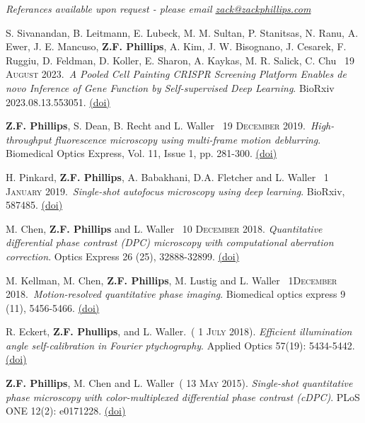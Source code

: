 \documentclass[12pt,letterpaper]{article}
\newcommand{\mhead}[1]{\leavevmode\marginpar{\sffamily\footnotesize #1}}
\renewcommand{\date}[1]{{} #1}
\begin{document}
\begin{center}\textit{Referances available upon request - please email \href{mailto:zack@zackphillips.com}{zack@zackphillips.com}}\end{center}

\newpage
\mhead{Publications}%
\par\vspace{-\baselineskip}

\medskip
S. Sivanandan, B. Leitmann, E. Lubeck, M. M. Sultan, P. Stanitsas, N. Ranu, A. Ewer, J. E. Mancuso, \textbf{Z.F. Phillips}, A. Kim, J. W. Bisognano, J. Cesarek, F. Ruggiu, D. Feldman,  D. Koller,  E. Sharon,  A. Kaykas,  M. R. Salick,  C. Chu~\date{19 \textsc{August} 2023}.~\emph{A Pooled Cell Painting CRISPR Screening Platform Enables de novo Inference of Gene Function by Self-supervised Deep Learning}. BioRxiv 2023.08.13.553051. \href{https://doi.org/10.1101/2023.08.13.553051}{(doi)}

\medskip
\textbf{Z.F. Phillips}, S. Dean, B. Recht and L. Waller~\date{19 \textsc{December} 2019}.~\emph{High-throughput fluorescence microscopy using multi-frame motion deblurring}. Biomedical Optics Express,  Vol. 11, Issue 1, pp. 281-300. \href{https://doi.org/10.1364/BOE.11.000281}{(doi)}

\medskip
H. Pinkard, \textbf{Z.F. Phillips}, A. Babakhani, D.A. Fletcher and L. Waller~\date{1 \textsc{January} 2019}.~\emph{Single-shot autofocus microscopy using deep learning}. BioRxiv, 587485. \href{https://doi.org/10.1101/587485}{(doi)}

\medskip
M. Chen, \textbf{Z.F. Phillips} and L. Waller~\date{10 \textsc{December} 2018}. \emph{Quantitative differential phase contrast (DPC) microscopy with computational aberration correction}. Optics Express 26 (25), 32888-32899. \href{https://doi.org/10.1364/OE.26.032888}{(doi)}

\medskip
M. Kellman, M. Chen, \textbf{Z.F. Phillips}, M. Lustig and L. Waller~\date{1\textsc{December} 2018}.~\emph{Motion-resolved quantitative phase imaging}. Biomedical optics express 9 (11), 5456-5466. \href{https://doi.org/10.1364/BOE.9.005456}{(doi)}

\medskip
R. Eckert, \textbf{Z.F. Phullips}, and L. Waller.~(\date{1 \textsc{July} 2018}).
\emph{Efficient illumination angle self-calibration in Fourier ptychography}.
Applied Optics 57(19): 5434-5442. \href{https://doi.org/10.1364/AO.57.005434}{(doi)}

\medskip
\textbf{Z.F. Phillips}, M. Chen and L. Waller~(\date{13 \textsc{May} 2015}).
\emph{Single-shot quantitative phase microscopy with color-multiplexed differential phase contrast (cDPC)}.
PLoS ONE 12(2): e0171228. \href{http://journals.plos.org/plosone/article?id=10.1371/journal.pone.0171228}{(doi)}
\end{document}
